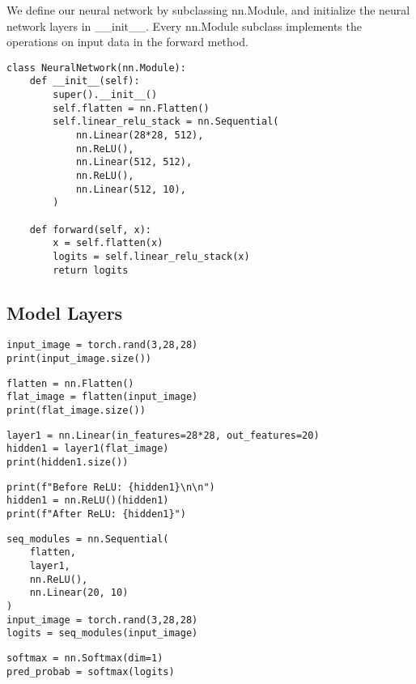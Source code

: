 \documentclass{article}
\begin{document}
We define our neural network by subclassing nn.Module, and initialize the 
neural network layers in \_\_init\_\_. Every nn.Module subclass implements the 
operations on input data in the forward method.

\begin{lstlisting}
class NeuralNetwork(nn.Module):
    def __init__(self):
        super().__init__()
        self.flatten = nn.Flatten()
        self.linear_relu_stack = nn.Sequential(
            nn.Linear(28*28, 512),
            nn.ReLU(),
            nn.Linear(512, 512),
            nn.ReLU(),
            nn.Linear(512, 10),
        )

    def forward(self, x):
        x = self.flatten(x)
        logits = self.linear_relu_stack(x)
        return logits
\end{lstlisting}

\subsection{Model Layers}

\begin{lstlisting}
input_image = torch.rand(3,28,28)
print(input_image.size())
\end{lstlisting}

\begin{lstlisting}
flatten = nn.Flatten()
flat_image = flatten(input_image)
print(flat_image.size())
\end{lstlisting}

\begin{lstlisting}
layer1 = nn.Linear(in_features=28*28, out_features=20)
hidden1 = layer1(flat_image)
print(hidden1.size())
\end{lstlisting}

\begin{lstlisting}
print(f"Before ReLU: {hidden1}\n\n")
hidden1 = nn.ReLU()(hidden1)
print(f"After ReLU: {hidden1}")
\end{lstlisting}

\begin{lstlisting}
seq_modules = nn.Sequential(
    flatten,
    layer1,
    nn.ReLU(),
    nn.Linear(20, 10)
)
input_image = torch.rand(3,28,28)
logits = seq_modules(input_image)
\end{lstlisting}

\begin{lstlisting}
softmax = nn.Softmax(dim=1)
pred_probab = softmax(logits)
\end{lstlisting}
\end{document}
